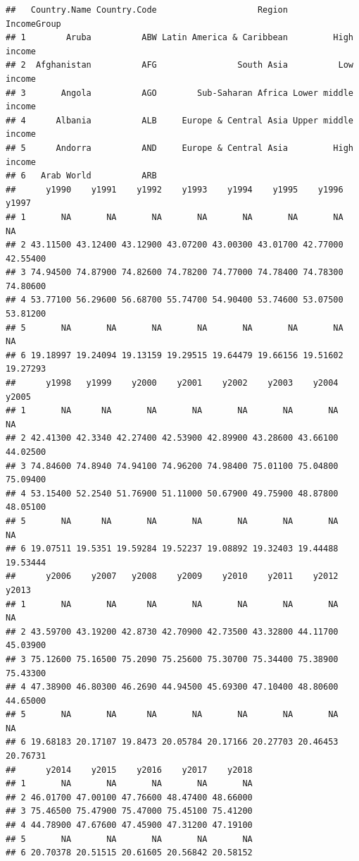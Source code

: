 \documentclass[]{book}
\begin{document}
\begin{verbatim}
##   Country.Name Country.Code                    Region         IncomeGroup
## 1        Aruba          ABW Latin America & Caribbean         High income
## 2  Afghanistan          AFG                South Asia          Low income
## 3       Angola          AGO        Sub-Saharan Africa Lower middle income
## 4      Albania          ALB     Europe & Central Asia Upper middle income
## 5      Andorra          AND     Europe & Central Asia         High income
## 6   Arab World          ARB                                              
##      y1990    y1991    y1992    y1993    y1994    y1995    y1996    y1997
## 1       NA       NA       NA       NA       NA       NA       NA       NA
## 2 43.11500 43.12400 43.12900 43.07200 43.00300 43.01700 42.77000 42.55400
## 3 74.94500 74.87900 74.82600 74.78200 74.77000 74.78400 74.78300 74.80600
## 4 53.77100 56.29600 56.68700 55.74700 54.90400 53.74600 53.07500 53.81200
## 5       NA       NA       NA       NA       NA       NA       NA       NA
## 6 19.18997 19.24094 19.13159 19.29515 19.64479 19.66156 19.51602 19.27293
##      y1998   y1999    y2000    y2001    y2002    y2003    y2004    y2005
## 1       NA      NA       NA       NA       NA       NA       NA       NA
## 2 42.41300 42.3340 42.27400 42.53900 42.89900 43.28600 43.66100 44.02500
## 3 74.84600 74.8940 74.94100 74.96200 74.98400 75.01100 75.04800 75.09400
## 4 53.15400 52.2540 51.76900 51.11000 50.67900 49.75900 48.87800 48.05100
## 5       NA      NA       NA       NA       NA       NA       NA       NA
## 6 19.07511 19.5351 19.59284 19.52237 19.08892 19.32403 19.44488 19.53444
##      y2006    y2007   y2008    y2009    y2010    y2011    y2012    y2013
## 1       NA       NA      NA       NA       NA       NA       NA       NA
## 2 43.59700 43.19200 42.8730 42.70900 42.73500 43.32800 44.11700 45.03900
## 3 75.12600 75.16500 75.2090 75.25600 75.30700 75.34400 75.38900 75.43300
## 4 47.38900 46.80300 46.2690 44.94500 45.69300 47.10400 48.80600 44.65000
## 5       NA       NA      NA       NA       NA       NA       NA       NA
## 6 19.68183 20.17107 19.8473 20.05784 20.17166 20.27703 20.46453 20.76731
##      y2014    y2015    y2016    y2017    y2018
## 1       NA       NA       NA       NA       NA
## 2 46.01700 47.00100 47.76600 48.47400 48.66000
## 3 75.46500 75.47900 75.47000 75.45100 75.41200
## 4 44.78900 47.67600 47.45900 47.31200 47.19100
## 5       NA       NA       NA       NA       NA
## 6 20.70378 20.51515 20.61605 20.56842 20.58152
\end{verbatim}
\end{document}
